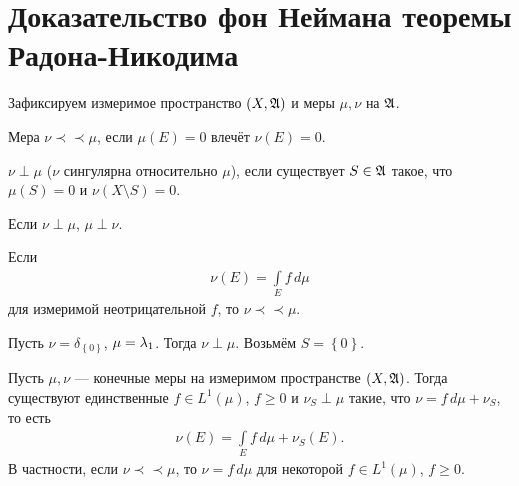 \section{Доказательство фон Неймана теоремы Радона-Никодима}

Зафиксируем измеримое пространство $(X, \mathfrak{A})$ и меры $\mu, \nu$ на $\mathfrak{A}$.
\begin{df*}
 Мера $\nu \prec \prec \mu$, если $\mu(E) = 0$ влечёт  $\nu(E) = 0$.
\end{df*}
\begin{df}
 $\nu \perp \mu$ ($\nu$ сингулярна относительно $\mu$), если существует $S \in \mathfrak{A}$ такое, что $\mu(S) = 0$ и  $\nu(X \setminus S) = 0$.
\end{df}
\begin{remrk*}
 Если $\nu \perp \mu$, $\mu \perp \nu$.
\end{remrk*}
\begin{exmpl}
 Если 
\begin{align*}
\nu(E) = \int\limits_{E} f \, d\mu  
\end{align*} для измеримой неотрицательной $f$, то $\nu \prec \prec \mu$.
\end{exmpl}
\begin{exmpl}
 Пусть $\nu = \delta_{\left\{ 0 \right\}}$, $\mu = \lambda_{1}$. Тогда $\nu \perp \mu$. Возьмём $S = \left\{ 0 \right\}$.
\end{exmpl}
\begin{thm}
\label{theorem:radon_nikodim}
 Пусть $\mu, \nu$ --- конечные меры на  измеримом пространстве $(X, \mathfrak{A})$. Тогда существуют единственные $f \in L^{1}(\mu)$, $f \geqslant 0$ и $\nu_S \perp \mu$ такие, что $\nu = f \, d\mu + \nu_S$, то есть \begin{align*}
  \nu(E) = \int\limits_{E} f \, d\mu  + \nu_S(E) 
 .\end{align*} В частности, если $\nu \prec \prec \mu$, то $\nu = f \, d\mu$ для некоторой $f \in L^{1}(\mu)$, $f \geqslant 0$.
\end{thm}

